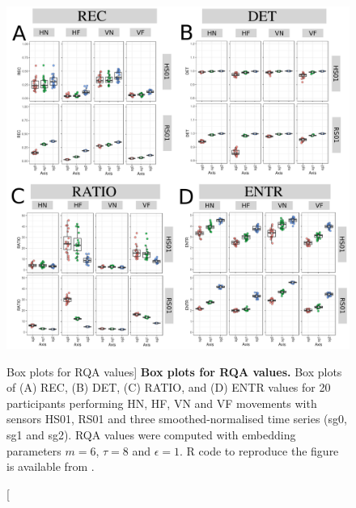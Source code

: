 \begin{figure}
\centering
\includegraphics[width=1.0\textwidth]{rqa-bp}
    \caption
	[Box plots for RQA values]{
	{\bf Box plots for RQA values.}
	Box plots of (A) REC, (B) DET, (C) RATIO, and (D) ENTR values 
	for 20 participants performing HN, HF, VN and VF movements
	with sensors HS01, RS01 and three smoothed-normalised  
	time series (sg0, sg1 and sg2).
	RQA values were computed with 
	embedding parameters $m=6$, $\tau=8$ and $\epsilon=1$.
	R code to reproduce the figure is available from \cite{hwum2018}.
        }
    \label{fig:RQABP}
\end{figure}


















